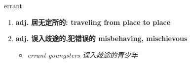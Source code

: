 
\begin{frame}
{\huge errant}
\begin{center}
\begin{enumerate}\Large
  \item \textbf{adj. 居无定所的: traveling from place to place}
  \item \textbf{adj. 误入歧途的,犯错误的 misbehaving, mischievous}
  \begin{itemize}
    \item \em{\Large{errant youngsters 误入歧途的青少年}}
  \end{itemize}
\end{enumerate}
\end{center}
\end{frame}
